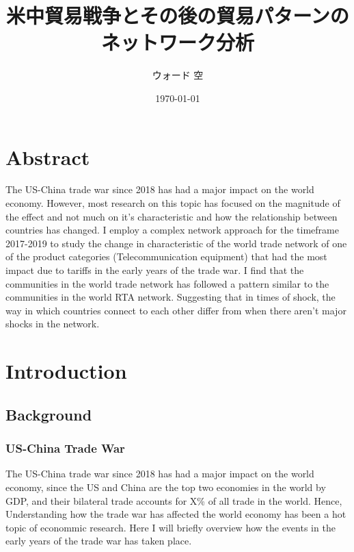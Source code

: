 \documentclass[a4paper, 12pt]{article}
\title{米中貿易戦争とその後の貿易パターンのネットワーク分析}
\author{ウォード 空}
\date{\today}
\begin{document}
\maketitle
\newpage

\section*{Abstract}
The US-China trade war since 2018 has had a major impact on the world economy.
However, most research on this topic has focused on the magnitude of the effect and not much on it's characteristic and how the relationship between countries has changed.
I employ a complex network approach for the timeframe 2017-2019 to study the change in characteristic of the world trade network of one of the product categories (Telecommunication equipment) that had the most impact due to tariffs in the early years of the trade war.
I find that the communities in the world trade network has followed a pattern similar to the communities in the world RTA network.
Suggesting that in times of shock, the way in which countries connect to each other differ from when there aren't major shocks in the network.
\newpage

\tableofcontents
\newpage

\section{Introduction}
    \subsection{Background}
        \subsubsection{US-China Trade War}
        The US-China trade war since 2018 has had a major impact on the world economy, since the US and China are the top two economies in the world by GDP, and their bilateral trade accounts for X\% of all trade in the world.
        Hence, Understanding how the trade war has affected the world economy has been a hot topic of econommic research.
        Here I will briefly overview how the events in the early years of the trade war has taken place.
    
\end{document}
